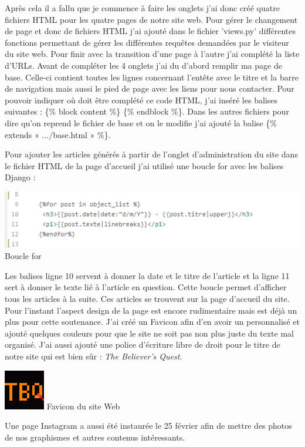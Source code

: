 \documentclass[]{extarticle}
\begin{document}
\begin{spacing}{1.25}
\bigbreak
Après cela il a fallu que je commence à faire les onglets j’ai donc créé quatre fichiers HTML pour les quatre pages de notre site web. Pour gérer le changement de page et donc de fichiers HTML j’ai ajouté dans le fichier 'views.py' différentes fonctions permettant de gérer les différentes requêtes demandées par le visiteur du site web. Pour finir avec la transition d’une page à l’autre j’ai complété la liste d'URLs. 
\bigbreak
Avant de compléter les 4 onglets j’ai du d'abord remplir ma page de base. Celle-ci contient toutes les lignes concernant l’entête avec le titre et la barre de navigation mais aussi le pied de page avec les liens pour nous contacter. Pour pouvoir indiquer où doit être complété ce code HTML, j’ai inséré les balises suivantes : \{\% block content \%\} \{\% endblock \%\}. Dans les autres fichiers pour dire qu’on reprend le fichier de base et on le modifie j’ai ajouté la balise \{\% extends « .../base.html » \%\}. 
\newpage

Pour ajouter les articles générés à partir de l’onglet d’administration du site dans le fichier HTML de la page d’accueil j’ai utilisé une boucle for avec les balises Django :
\bigbreak
\begin{center}
\includegraphics[scale = 1]{boucle_for.png}
\smallbreak
Boucle for
\end{center}
\bigbreak
Les balises ligne 10 servent à donner la date et le titre de l’article et la ligne 11 sert à donner le texte lié à l’article en question. Cette boucle permet d’afficher tous les articles à la suite. Ces articles se trouvent sur la page d’accueil du site.
\bigbreak
Pour l'instant l’aspect design de la page est encore rudimentaire mais est déjà un plus pour cette soutenance. J’ai créé un Favicon afin d’en avoir un personnalisé et ajouté quelques couleurs pour que le site ne soit pas non plus juste du texte mal organisé. J’ai aussi ajouté une police d’écriture libre de droit pour le titre de notre site qui est bien sûr : \textit{The Believer’s Quest}.
\bigbreak
\begin{center}
\includegraphics[scale = 1]{image_TBQ.png}
\smallbreak
Favicon du site Web
\end{center}
\bigbreak
Une page Instagram a aussi été instaurée le 25 février afin de mettre des photos de nos graphismes et autres contenus intéressants.
\newpage


\end{spacing}
\end{document}
